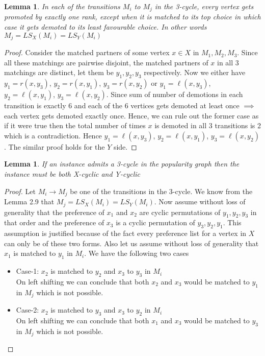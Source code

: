 \documentclass[a4paper,10pt]{article}
\theoremstyle{plain} %
\newtheorem{lemma}[theorem]{Lemma} %
\theoremstyle{plain} %
\begin{document}
\begin{lemma}
    In each of the transitions $M_i$ to $M_j$ in the 3-cycle, every vertex gets promoted by exactly one rank, except when it is matched to its top choice in which case it gets demoted to its least favourable choice. In other words $M_j = LS_X(M_i) = LS_Y(M_i)$
\end{lemma}

\begin{proof}
    Consider the matched partners of some vertex $x \in X$ in $M_1, M_2, M_3$. Since all these matchings are pairwise disjoint, the matched partners of $x$ in all 3 matchings are distinct, let them be $y_1, y_2, y_3$ respectively. Now we either have $y_1 = r(x, y_3)$, $y_2 = r(x, y_1)$, $y_3 = r(x, y_2)$ or $y_1 = \ell(x, y_3)$, $y_2 = \ell(x, y_1)$, $y_3 = \ell(x, y_2)$. Since sum of number of demotions in each transition is exactly 6 and each of the 6 vertices gets demoted at least once $\implies$ each vertex gets demoted exactly once. Hence, we can rule out the former case as if it were true then the total number of times $x$ is demoted in all 3 transitions is 2 which is a contradiction. Hence $y_1 = \ell(x, y_3)$, $y_2 = \ell(x, y_1)$, $y_3 = \ell(x, y_2)$. The similar proof holds for the $Y$ side.
\end{proof}

\begin{lemma}
    If an instance admits a 3-cycle in the popularity graph then the instance must be both X-cyclic and Y-cyclic
\end{lemma}

\begin{proof}
    Let $M_i \rightarrow M_j$ be one of the transitions in the 3-cycle. We know from the Lemma 2.9 that $M_j = LS_X(M_i) = LS_Y(M_i)$. Now assume without loss of generality that the preference of $x_1$ and $x_2$ are cyclic permutations of $y_1, y_2, y_3$ in that order and the preference of $x_3$ is a cyclic permutation of $y_3, y_2, y_1$. This assumption is justified because of the fact every preference list for a vertex in $X$ can only be of these two forms. Also let us assume without loss of generality that $x_1$ is matched to $y_1$ in $M_i$. We have the following two cases
    \begin{itemize}
        \item Case-1: $x_2$ is matched to $y_2$ and $x_3$ to $y_3$ in $M_i$ \\
        On left shifting we can conclude that both $x_2$ and $x_3$ would be matched to $y_1$ in $M_j$ which is not possible.
        \item Case-2: $x_2$ is matched to $y_3$ and $x_3$ to $y_2$ in $M_i$ \\
        On left shifting we can conclude that both $x_1$ and $x_3$ would be matched to $y_3$ in $M_j$ which is not possible.
    \end{itemize}
\end{proof}
\end{document}
